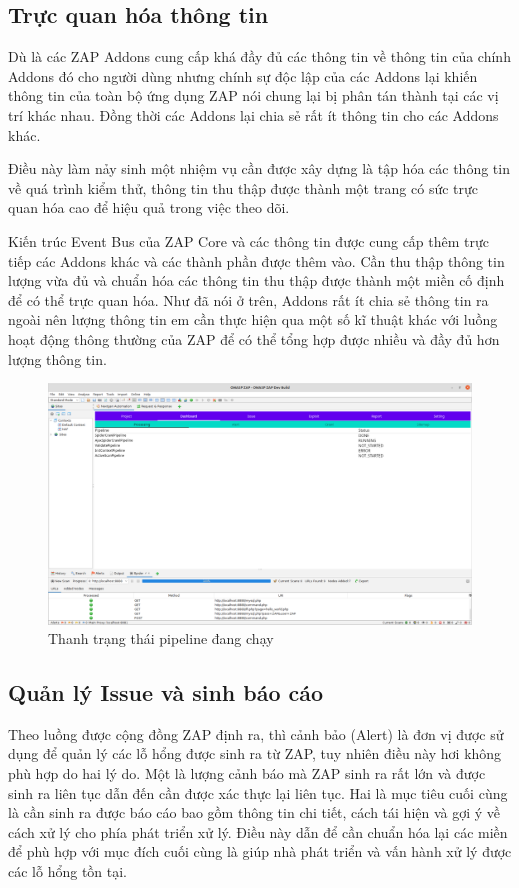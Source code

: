 \documentclass[./../main.tex]{subfiles}
\begin{document}
\subsection{Trực quan hóa thông tin}
Dù là các ZAP Addons cung cấp khá đầy đủ các thông tin về thông tin của
chính Addons đó cho người dùng nhưng chính sự độc lập của các Addons lại
khiến thông tin của toàn bộ ứng dụng ZAP nói chung lại bị phân tán thành
tại các vị trí khác nhau. Đồng thời các Addons lại chia sẻ rất ít thông
tin cho các Addons khác.

Điều này làm nảy sinh một nhiệm vụ cần được xây dựng là tập hóa các thông
tin về quá trình kiểm thử, thông tin thu thập được thành một trang có sức
trực quan hóa cao để hiệu quả trong việc theo dõi.

Kiến trúc Event Bus của ZAP Core và các thông tin được cung cấp thêm trực
tiếp các Addons khác và các thành phần được thêm vào. Cần thu thập thông
tin lượng vừa đủ và chuẩn hóa các thông tin thu thập được thành một miền
cố định để có thể trực quan hóa. Như đã nói ở trên, Addons rất ít chia sẻ
thông tin ra ngoài nên lượng thông tin em cần thực hiện qua một số kĩ
thuật khác với luồng hoạt động thông thường của ZAP để có thể tổng hợp
được nhiều và đầy đủ hơn lượng thông tin.

\begin{figure}[H]
	\includegraphics[width=\linewidth]{./images/state.png}
	\caption{Thanh trạng thái pipeline đang chạy}
	\label{fig:state}
\end{figure}

\subsection{Quản lý Issue và sinh báo cáo}
Theo luồng được cộng đồng ZAP định ra, thì cảnh bảo (Alert) là đơn
vị được sử dụng để quản lý các lỗ hổng được sinh ra từ ZAP, tuy nhiên
điều này hơi không phù hợp do hai lý do. Một là lượng cảnh báo mà ZAP
sinh ra rất lớn và được sinh ra liên tục dẫn đến cần được xác thực lại
liên tục. Hai là mục tiêu cuối cùng là cần sinh ra được báo cáo bao gồm
thông tin chi tiết, cách tái hiện và gợi ý về cách xử lý cho phía
phát triển xử lý. Điều này dẫn để cần chuẩn hóa lại các miền để
phù hợp với mục đích cuối cùng là giúp nhà phát triển và vấn hành
xử lý được các lỗ hổng tồn tại.
\end{document}
